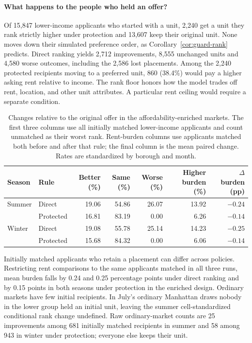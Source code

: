 \paragraph{What happens to the people who held an offer?}
Of 15,847 lower-income applicants who started with a unit, 2,240 get a unit
they rank strictly higher under protection and 13,607 keep their original
unit. None moves down their simulated preference order, as
Corollary~\ref{cor:guard-rank} predicts. Direct ranking yields 2,712
improvements, 8,555 unchanged units and 4,580 worse outcomes, including the
2,586 lost placements. Among the 2,240 protected recipients moving to a
preferred unit, 860 (38.4\%) would pay a higher asking rent relative to income.
The rank floor honors how the model trades off rent, location, and other unit
attributes. A particular rent ceiling would require a separate condition.

\begin{table}[t]
\centering\small
\begin{tabular}{@{}llrrrrr@{}}\toprule
Season & Rule & Better (\%) & Same (\%) & Worse (\%) & Higher burden (\%) & $\Delta$ burden (pp)\\\midrule
Summer & Direct    & 19.06 & 54.86 & 26.07 & 13.92 & $-0.24$\\
       & Protected & 16.81 & 83.19 &  0.00 &  6.26 & $-0.14$\\
Winter & Direct    & 19.08 & 55.78 & 25.14 & 14.23 & $-0.25$\\
       & Protected & 15.68 & 84.32 &  0.00 &  6.06 & $-0.14$\\
\bottomrule\end{tabular}
\caption{Changes relative to the original offer in the affordability-enriched
markets. The first three columns use all initially matched lower-income applicants
and count unmatched as their worst rank. Rent-burden columns use applicants matched
both before and after that rule; the final column is the mean paired change.
Rates are standardized by borough and month.}
\label{tab:guard-ranks}
\end{table}

Initially matched applicants who retain a placement can differ across policies.
Restricting rent comparisons to the same applicants matched in all three runs,
mean burden falls by 0.24 and 0.25 percentage points under direct ranking and
by 0.15 points in both seasons under protection in the enriched design.
Ordinary markets have few initial recipients. In July's ordinary Manhattan
draws nobody in the lower group held an initial unit, leaving the summer
cell-standardized conditional rank change undefined. Raw ordinary-market
counts are 25 improvements among 681 initially matched recipients in summer
and 58 among 943 in winter under protection; everyone else keeps their unit.
